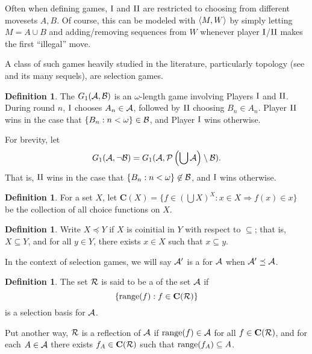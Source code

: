 \documentclass{amsart}
\theoremstyle{plain}
\theoremstyle{definition}
\newtheorem{definition}[theorem]{Definition}
\theoremstyle{remark}
\theoremstyle{plain}
\theoremstyle{definition}
\theoremstyle{remark}
\begin{document}
Often when defining games, \(\mathrm{I}\) and \(\mathrm{II}\) are restricted to choosing
from different movesets \(A,B\). Of course, this can be modeled with \(\langle M,W\rangle\)
by simply letting \(M=A\cup B\) and adding/removing sequences from \(W\)
whenever player \(\mathrm{I}\)/\(\mathrm{II}\) makes the first ``illegal'' move.

A class of such games heavily studied in the literature, particularly
topology (see \cite{MR1378387} and its
many sequels), are selection games.

\begin{definition}
  The  \(G_{1}(\mathcal{A},\mathcal{B})\) 
  is an \(\omega\)-length game involving Players \(\mathrm{I}\) and \(\mathrm{II}\). 
  During round \(n\), \(\mathrm{I}\) chooses
  \(A_n\in\mathcal{A}\), followed by \(\mathrm{II}\) choosing \(B_n\in A_n\).
  Player \(\mathrm{II}\) wins in the case that \(\{B_n:n<\omega\}\in\mathcal{B}\),
  and Player \(\mathrm{I}\) wins otherwise.
\end{definition}

  For brevity, let 
  \[
    G_{1}(\mathcal{A},\neg \mathcal{B})
      =
    G_{1}(\mathcal{A},\mathcal{P}\left(\bigcup \mathcal{A}\right)\setminus \mathcal{B})
  .\]
  That is, \(\mathrm{II}\) wins in the case that \(\{B_n:n<\omega\}\not\in\mathcal{B}\),
  and \(\mathrm{I}\) wins otherwise.

\begin{definition}
  For a set \(X\), let \(\mathbf C(X)=\{f\in(\bigcup X)^X:x\in X\Rightarrow f(x)\in x\}\)
  be the collection of all choice functions on \(X\).
\end{definition}

\begin{definition}
  Write \(X\preceq Y\) if \(X\) is coinitial in \(Y\) with respect to \(\subseteq\);
  that is, \(X\subseteq Y\), and for all \(y\in Y\), there exists \(x\in X\) such that 
  \(x\subseteq y\).

  In the context of selection games, we will say \(\mathcal{A}'\) is a 
  for \(\mathcal{A}\) when \(\mathcal{A}'\preceq \mathcal{A}\).
\end{definition}

\begin{definition}
  The set \(\mathcal{R}\) is said to be a  of the set \(\mathcal{A}\)
  if \[\{\text{range}(f):f\in\mathbf C(\mathcal{R})\}\] is a selection basis for \(\mathcal{A}\).
\end{definition}

Put another way, \(\mathcal{R}\) is a reflection of \(\mathcal{A}\) if \(\text{range}(f)\in\mathcal{A}\) 
for all \(f\in\mathbf C(\mathcal{R})\), and for each \(A\in\mathcal{A}\) there exists
\(f_A\in\mathbf C(\mathcal{R})\) such that \(\text{range}(f_A)\subseteq A\).
\end{document}
